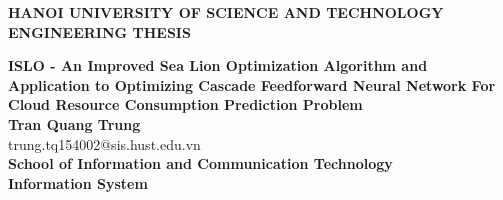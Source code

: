 \documentclass[main.tex]{subfiles}
\begin{document}
\begin{titlepage}
\thispagestyle{empty}
\begin{center}

{\textbf{\large{HANOI UNIVERSITY OF SCIENCE AND TECHNOLOGY}}}\\[4cm]

{\textbf{\huge{ENGINEERING THESIS}}}\\[1cm]
{\textbf{\Large{ISLO - An Improved Sea Lion Optimization Algorithm and Application to Optimizing Cascade Feedforward Neural Network For Cloud Resource Consumption Prediction Problem}}\\[1cm]

{\textbf{\large{Tran Quang Trung}}}\\
{\large{trung.tq154002@sis.hust.edu.vn}}\\[0.5cm]

{\textbf{\large{School of Information and Communication Technology}}}\\
{\textbf{\large{Information System}}}\\

\vspace{3.5cm}
\begin{table}[H]
\centering
{}
\end{table}}
\end{center}



\end{titlepage}
\end{document}
